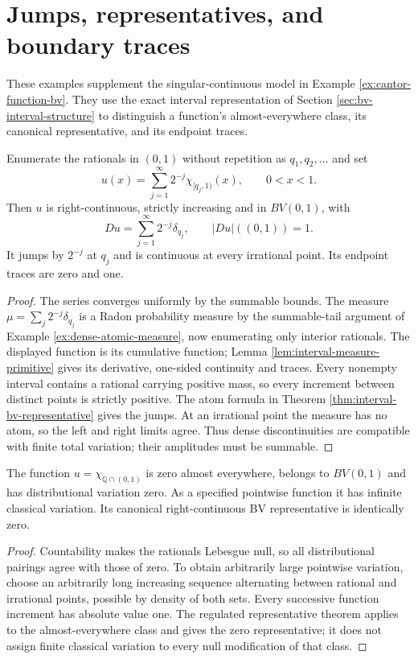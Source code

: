 \chapter{Jumps, representatives, and boundary traces}\label{sec:examples-bv-interval}
These examples supplement the singular-continuous model in Example \ref{ex:cantor-function-bv}. They use the exact interval representation of Section \ref{sec:bv-interval-structure} to distinguish a function's almost-everywhere class, its canonical representative, and its endpoint traces.

\begin{example}\label{ex:bv-dense-jumps}
Enumerate the rationals in $(0,1)$ without repetition as $q_1,q_2,\ldots$ and set
\[
 u(x)=\sum_{j=1}^\infty 2^{-j}\chi_{[q_j,1)}(x),\qquad 0<x<1.
\]
Then $u$ is right-continuous, strictly increasing and in $BV(0,1)$, with
\[
 Du=\sum_{j=1}^\infty 2^{-j}\delta_{q_j},\qquad |Du|((0,1))=1.
\]
It jumps by $2^{-j}$ at $q_j$ and is continuous at every irrational point. Its endpoint traces are zero and one.
\end{example}
\begin{proof}
The series converges uniformly by the summable bounds. The measure $\mu=\sum_j2^{-j}\delta_{q_j}$ is a Radon probability measure by the summable-tail argument of Example \ref{ex:dense-atomic-measure}, now enumerating only interior rationals. The displayed function is its cumulative function; Lemma \ref{lem:interval-measure-primitive} gives its derivative, one-sided continuity and traces. Every nonempty interval contains a rational carrying positive mass, so every increment between distinct points is strictly positive. The atom formula in Theorem \ref{thm:interval-bv-representative} gives the jumps. At an irrational point the measure has no atom, so the left and right limits agree. Thus dense discontinuities are compatible with finite total variation; their amplitudes must be summable.
\end{proof}

\begin{example}\label{ex:dirichlet-function-bv-representative}
The function $u=\chi_{\mathbb Q\cap(0,1)}$ is zero almost everywhere, belongs to $BV(0,1)$ and has distributional variation zero. As a specified pointwise function it has infinite classical variation. Its canonical right-continuous BV representative is identically zero.
\end{example}
\begin{proof}
Countability makes the rationals Lebesgue null, so all distributional pairings agree with those of zero. To obtain arbitrarily large pointwise variation, choose an arbitrarily long increasing sequence alternating between rational and irrational points, possible by density of both sets. Every successive function increment has absolute value one. The regulated representative theorem applies to the almost-everywhere class and gives the zero representative; it does not assign finite classical variation to every null modification of that class.
\end{proof}

